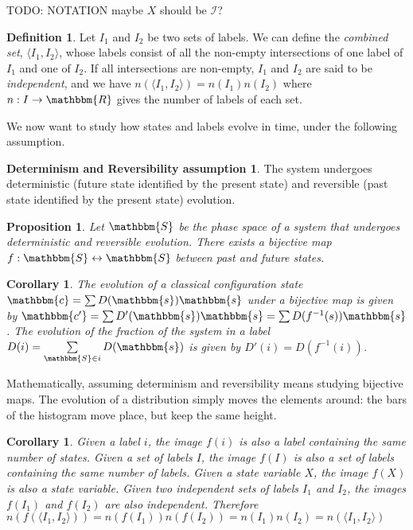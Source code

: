 \documentclass[aps,pra,10pt,twocolumn,floatfix,nofootinbib]{revtex4-1}
\newtheorem{cor}[thm]{Corollary}
\newtheorem{prop}[thm]{Proposition}
\theoremstyle{definition}
\newtheorem{defn}[thm]{Definition}
\newtheorem*{assump2}{Determinism and Reversibility assumption}
\begin{document}
TODO: NOTATION maybe $X$ should be $\mathcal{I}$?

\begin{defn}\label{labelsCombine}
Let $I_1$ and $I_2$ be two sets of labels. We can define the \emph{combined set}, $\langle I_1, I_2 \rangle$, whose labels consist of all the non-empty intersections of one label of $I_1$ and one of $I_2$. If all intersections are non-empty, $I_1$ and $I_2$ are said to be \emph{independent}, and we have $n(\langle I_1, I_2 \rangle)=n(I_1)n(I_2)$ where $n: I \rightarrow \mathbbm{R}$ gives the number of labels of each set.
\end{defn}

We now want to study how states and labels evolve in time, under the following assumption.

\begin{assump2}
The system undergoes deterministic (future state identified by the present state) and reversible (past state identified by the present state) evolution.
\end{assump2}

\begin{prop}\label{detrevMap}
Let $\mathbbm{S}$ be the phase space of a system that undergoes deterministic and reversible evolution. There exists a bijective map $f:\mathbbm{S} \leftrightarrow \mathbbm{S}$ between past and future states.
\end{prop}

\begin{cor}\label{detrevDist}
The evolution of a classical configuration state $\mathbbm{c}=\sum D(\mathbbm{s}) \mathbbm{s}$ under a bijective map is given by $\mathbbm{c'}=\sum D'(\mathbbm{s}) \mathbbm{s}=\sum D(f^{-1}(s)) \mathbbm{s}$. The evolution of the fraction of the system in a label $D(i)=\sum\limits_{\mathbbm{S} \in i} D(\mathbbm{s})$ is given by $D'(i)=D(f^{-1}(i))$.
\end{cor}

Mathematically, assuming determinism and reversibility means studying bijective maps. The evolution of a distribution simply moves the elements around: the bars of the histogram move place, but keep the same height.

\begin{cor}\label{labelsCount}
Given a label $i$, the image $f(i)$ is also a label containing the same number of states. Given a set of labels $I$, the image $f(I)$ is also a set of labels containing the same number of labels. Given a state variable $X$, the image $f(X)$ is also a state variable. Given two independent sets of labels $I_1$ and $I_2$, the images $f(I_1)$ and $f(I_2)$ are also independent. Therefore $n(f(\langle I_1, I_2 \rangle))=n(f(I_1))n(f(I_2))=n(I_1)n(I_2)=n(\langle I_1, I_2 \rangle)$
\end{cor}
\end{document}
